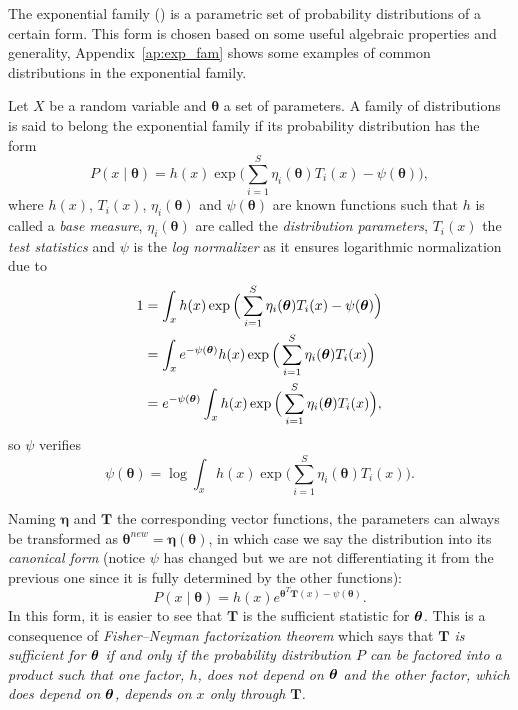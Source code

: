
The exponential family (\cite{koopman1936distributions}) is a parametric set of probability distributions of a certain form. This form is chosen based on some useful algebraic properties and generality, Appendix~\ref{ap:exp_fam} shows some examples of common distributions in the exponential family.

Let \(X\) be a random variable and \(\bm{\theta}\) a set of parameters. A family of distributions is said to belong the exponential family if its probability distribution has the form
\[
  P(x \mid \bm{\theta}) = h(x)\exp{\Big( \sum_{i=1}^{S} \eta_{i}(\bm{\theta})T_{i}(x) - \psi(\bm{\theta}) \Big)},
\]
where \(h(x)\), \(T_{i}(x)\), \(\eta_{i}(\bm{\theta})\) and \(\psi(\bm{\theta})\)  are known functions such that \(h\) is called a \emph{base measure}, \(\eta_{i}(\bm{\theta})\) are called the \emph{distribution parameters},  \(T_{i}(x)\) the \emph{test statistics} and \(\psi\) is the \emph{log normalizer} as it ensures logarithmic normalization due to
\[
  \begin{aligned}
    1 &= \int_{x}  h(x)\exp{\Big( \sum_{i=1}^{S} \eta_{i}(\bm{\theta})T_{i}(x) - \psi(\bm{\theta}) \Big)}\\
    &= \int_{x} e^{-\psi(\bm{\theta})} h(x)\exp{\Big( \sum_{i=1}^{S} \eta_{i}(\bm{\theta})T_{i}(x) \Big)}\\
    &= e^{-\psi(\bm{\theta})} \int_{x} h(x)\exp{\Big( \sum_{i=1}^{S} \eta_{i}(\bm{\theta})T_{i}(x) \Big)},
  \end{aligned}
\]
so \(\psi\) verifies
\[
      \psi(\bm{\theta}) = \log \int_{x} h(x) \exp \Big( \sum_{i=1}^{S} \eta_{i}(\bm{\theta})T_{i}(x) \Big).
\]

Naming \(\bm{\eta}\) and \(\bm{T}\) the corresponding vector functions, the parameters can always be transformed as \(\bm{\theta}^{new} = \bm{\eta}(\bm{\theta})\), in which case we say the distribution into its \emph{canonical form} (notice \(\psi\) has changed but we are not differentiating it from the previous one since it is fully determined by the other functions):
\[
  P(x \mid \bm{\theta}) = h(x) e^{\bm{\theta}^{T}\bm{T}(x) - \psi(\bm{\theta})}.
\]
In this form, it is easier to see that \(\bm{T}\) is the sufficient statistic for \(\bm{\theta}\). This is a consequence of \emph{Fisher–Neyman factorization theorem} which says that \textit{\(\bm{T}\) is sufficient for \(\bm{\theta}\)  if and only if the probability distribution \(P\)  can be factored into a product such that one factor, \(h\), does not depend on \(\bm{\theta}\)  and the other factor, which does depend on \(\bm{\theta}\), depends on \(x\)  only through \(\bm{T}\).}

